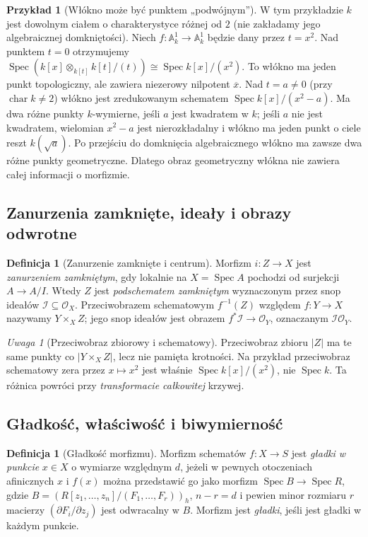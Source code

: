 \documentclass[11pt,a4paper,openany]{report}
\numberwithin{equation}{section}
\theoremstyle{plain}
\theoremstyle{definition}
\newtheorem{definicja}[twierdzenie]{Definicja}
\newtheorem{przyklad}[twierdzenie]{Przykład}
\theoremstyle{remark}
\newtheorem{uwaga}[twierdzenie]{Uwaga}
\newcommand{\A}{\mathbb A}
\newcommand{\Spec}{\operatorname{Spec}}
\begin{document}
\begin{przyklad}[Włókno może być punktem „podwójnym”]
\label{prz:ga5-double-fibre}
W tym przykładzie $k$ jest dowolnym ciałem o charakterystyce różnej od $2$ (nie zakładamy jego algebraicznej domkniętości).
Niech $f:\A^1_k\to\A^1_k$ będzie dany przez $t=x^2$.
Nad punktem $t=0$ otrzymujemy
$\Spec(k[x]\otimes_{k[t]}k[t]/(t))\cong\Spec k[x]/(x^2)$.
To włókno ma jeden punkt topologiczny, ale zawiera niezerowy
nilpotent $\overline x$. Nad $t=a\ne0$ (przy $\operatorname{char}k\ne2$)
włókno jest zredukowanym schematem $\Spec k[x]/(x^2-a)$.
Ma dwa różne punkty $k$-wymierne, jeśli $a$ jest kwadratem
w $k$; jeśli $a$ nie jest kwadratem, wielomian $x^2-a$
jest nierozkładalny i włókno ma jeden punkt o ciele reszt
$k(\sqrt a)$. Po przejściu do domknięcia algebraicznego
włókno ma zawsze dwa różne punkty geometryczne.
Dlatego obraz geometryczny włókna nie zawiera całej informacji
o morfizmie.
\end{przyklad}

\subsection{Zanurzenia zamknięte, ideały i obrazy odwrotne}

\begin{definicja}[Zanurzenie zamknięte i centrum]
Morfizm $i:Z\to X$ jest \emph{zanurzeniem zamkniętym}, gdy
lokalnie na $X=\Spec A$ pochodzi od surjekcji $A\to A/I$.
Wtedy $Z$ jest \emph{podschematem zamkniętym} wyznaczonym
przez snop ideałów $\mathcal I\subseteq\mathcal O_X$.
Przeciwobrazem schematowym $f^{-1}(Z)$ względem $f:Y\to X$
nazywamy $Y\times_X Z$; jego snop ideałów jest
obrazem $f^*\mathcal I\to\mathcal O_Y$, oznaczanym
$\mathcal I\mathcal O_Y$.
\end{definicja}

\begin{uwaga}[Przeciwobraz zbiorowy i schematowy]
Przeciwobraz zbioru $|Z|$ ma te same punkty co
$|Y\times_X Z|$, lecz nie pamięta krotności. Na przykład
przeciwobraz schematowy zera przez $x\mapsto x^2$
jest właśnie $\Spec k[x]/(x^2)$, nie $\Spec k$.
Ta różnica powróci przy \emph{transformacie całkowitej} krzywej.
\end{uwaga}

\subsection{Gładkość, właściwość i biwymierność}

\begin{definicja}[Gładkość morfizmu]
\label{def:ga5-smooth}
Morfizm schematów $f:X\to S$ jest \emph{gładki w punkcie}
$x\in X$ o wymiarze względnym $d$, jeżeli w pewnych otoczeniach
afinicznych $x$ i $f(x)$ można przedstawić go jako morfizm
$\Spec B\to\Spec R$, gdzie
$B=(R[z_1,\ldots,z_n]/(F_1,\ldots,F_r))_h$,
$n-r=d$ i pewien minor rozmiaru $r$ macierzy
$(\partial F_i/\partial z_j)$ jest odwracalny w $B$.
Morfizm jest \emph{gładki}, jeśli jest gładki w każdym punkcie.
\end{definicja}
\end{document}
